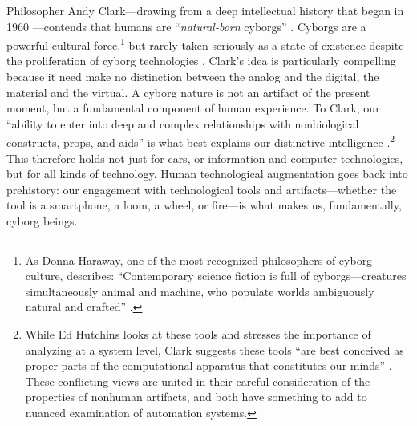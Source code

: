 Philosopher Andy
Clark---drawing from a deep intellectual history that began in 1960 \cite{clyneskline}---contends that humans are ``\emph{natural-born}
cyborgs'' \cite[p. 6]{clarkNBC}. Cyborgs are a powerful cultural
force,\footnote{As Donna Haraway, one of the most recognized
philosophers of cyborg culture, describes:
``Contemporary science 
fiction is full of cyborgs---creatures simultaneously
animal and machine, who populate worlds ambiguously natural and
crafted'' \cite[p. 117]{haraway}.} but rarely taken seriously as a state
of existence despite the proliferation of cyborg technologies \cite[p.
  65]{ekbia}. Clark's idea is particularly compelling
because it need make no distinction between the analog and the
digital, the material and the virtual. A cyborg nature is not an artifact of the
present moment, but a fundamental component of human experience. To
Clark, our ``ability to enter into deep and complex relationships with
nonbiological constructs, props, and aids'' is what best explains our
distinctive intelligence \cite[p. 5]{clarkNBC}.\footnote{While Ed
  Hutchins looks at these tools and stresses the importance of
  analyzing at a system level, Clark suggests these tools ``are best
  conceived as proper parts of the computational apparatus that
  constitutes our minds'' \cite[p. 6]{clarkNBC}. These conflicting views are
  united in their careful consideration of the properties of nonhuman artifacts,
  and both have something to add to nuanced examination of automation
  systems.} This therefore holds 
not just for cars, or information and computer technologies, but for
all kinds of technology. Human technological augmentation goes back into
prehistory: our engagement with technological tools and
artifacts---whether the tool is a smartphone, a loom, a wheel, or
fire---is what makes us, fundamentally, cyborg beings.


